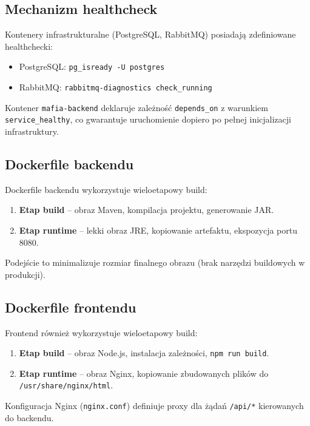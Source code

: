﻿\documentclass[a4paper,twoside,11pt]{mwrep}
\theoremstyle{plain} \newtheorem{thm}{Twierdzenie}
\theoremstyle{plain} \newtheorem{lem}{Lemat}
\theoremstyle{definition} \newtheorem{defn}{Definicja}
\theoremstyle{remark} \newtheorem*{rem}{Wniosek}
\begin{document}
\subsection{Mechanizm healthcheck}

Kontenery infrastrukturalne (PostgreSQL, RabbitMQ) posiadają zdefiniowane healthchecki:

\begin{itemize}
    \item PostgreSQL: \texttt{pg\_isready -U postgres}
    \item RabbitMQ: \texttt{rabbitmq-diagnostics check\_running}
\end{itemize}

Kontener \texttt{mafia-backend} deklaruje zależność \texttt{depends\_on} z warunkiem \texttt{service\_healthy}, co gwarantuje uruchomienie dopiero po pełnej inicjalizacji infrastruktury.

\subsection{Dockerfile backendu}

Dockerfile backendu wykorzystuje wieloetapowy build:
\begin{enumerate}
    \item \textbf{Etap build} -- obraz Maven, kompilacja projektu, generowanie JAR.
    \item \textbf{Etap runtime} -- lekki obraz JRE, kopiowanie artefaktu, ekspozycja portu 8080.
\end{enumerate}

Podejście to minimalizuje rozmiar finalnego obrazu (brak narzędzi buildowych w produkcji).

\subsection{Dockerfile frontendu}

Frontend również wykorzystuje wieloetapowy build:
\begin{enumerate}
    \item \textbf{Etap build} -- obraz Node.js, instalacja zależności, \texttt{npm run build}.
    \item \textbf{Etap runtime} -- obraz Nginx, kopiowanie zbudowanych plików do \texttt{/usr/share/nginx/html}.
\end{enumerate}

Konfiguracja Nginx (\texttt{nginx.conf}) definiuje proxy dla żądań \texttt{/api/*} kierowanych do backendu.
\end{document}

